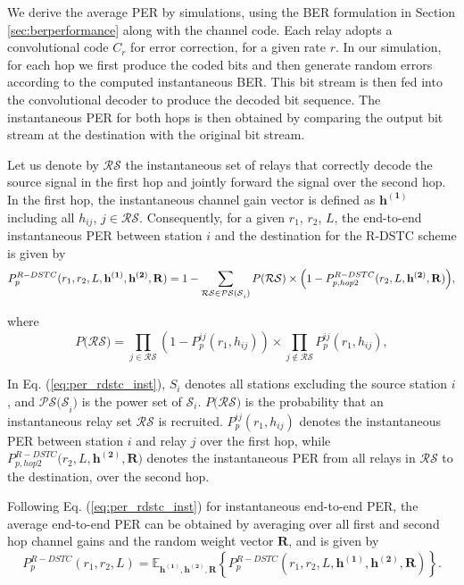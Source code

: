 \documentclass[peerreview,draftcls,onecolumn,12pt,a4paper]{IEEEtran}
\begin{document}
We derive the average PER by simulations, using the BER
formulation in Section \ref{sec:berperformance} along with the
channel code. Each relay adopts a convolutional code $C_r$ for
error correction, for a given rate $r$. In our simulation, for
each hop we first produce the coded bits and then generate random
errors according to the computed instantaneous BER. This bit
stream is then fed into the convolutional decoder to produce the
decoded bit sequence. The instantaneous PER for both hops is then
obtained by comparing the output bit stream at the destination
with the original bit stream.

Let us denote by $\mathcal{RS}$ the instantaneous set of relays
that correctly decode the source signal in the first hop and
jointly forward the signal over the second hop. In the first hop,
the instantaneous channel gain vector is defined as
$\mathbf{h^{(1)}}$ including all $h_{ij}$, $j \in \mathcal{RS}$. Consequently, for a given $r_1$, $r_2$, $L$, the end-to-end
instantaneous PER between station $i$ and the destination for the
R-DSTC scheme is given by
\begin{equation}
\small {P}_{p}^{R-DSTC}(r_1, r_2, L, {\mathbf{h^{(1)}}},
\mathbf{h^{(2)}, R}) = 1- \sum_{\mathcal{RS} \in \mathcal {PS
(S}_i) } P\mathcal{(RS}) \times { \left(
1-P_{p,hop2}^{R-DSTC}{\mathbf(r_2, L, \mathbf{h^{(2)},R}})\right)}
, \label{eq:per_rdstc_inst}
\end{equation}

where
\begin{equation}
P\mathcal{(RS}) = \prod_{j \in \mathcal{RS}} (1-P_{p}^{ij}(r_1,
h_{ij})) \times \prod_{j \notin \mathcal{RS}} P_{p}^{ij}(r_1,
h_{ij}), \label{eq:prob_rs}
\end{equation}

In Eq. (\ref{eq:per_rdstc_inst}), $S_i$ denotes all stations
excluding the source station $i$, and $\mathcal{PS (S}_i)$ is the
power set of $\mathcal{S}_i$. $P\mathcal{(RS})$ is the probability
that an instantaneous relay set $\mathcal{RS}$ is recruited.
$P_{p}^{ij}(r_1, h_{ij})$ denotes the instantaneous PER between
station $i$ and relay $j$ over the first hop, while $P_{p,
hop2}^{R-DSTC}{\mathbf(r_2,L, \mathbf{h^{(2)},R})}$ denotes the
instantaneous PER from all relays in $\mathcal{RS}$ to the
destination, over the second hop.

Following Eq. (\ref{eq:per_rdstc_inst}) for instantaneous
end-to-end PER, the average end-to-end PER can be obtained by
averaging over all first and second hop channel gains and the
random weight vector $\mathbf{R}$, and is given by
\begin{equation}
{P_p^{R-DSTC}(r_1, r_2,L)} =
\mathbb{E}_{\mathbf{h^{(1)},h^{(2)},R}}\left\{{P}_{p}^{R-DSTC}(r_1,
r_2, L, {\mathbf{h^{(1)}}}, \mathbf{h^{(2)}, R})\right\}.
\label{eq:rdstce2ePEP}
\end{equation}
\end{document}
